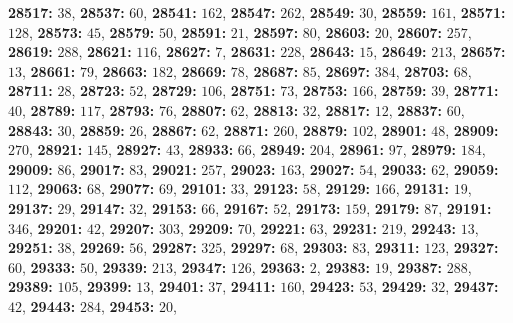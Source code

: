\textsf{\bfseries 28517:} $38$, \textsf{\bfseries 28537:} $60$, \textsf{\bfseries 28541:} $162$, \textsf{\bfseries 28547:} $262$, \textsf{\bfseries 28549:} $30$, \textsf{\bfseries 28559:} $161$, \textsf{\bfseries 28571:} $128$, \textsf{\bfseries 28573:} $45$, \textsf{\bfseries 28579:} $50$, \textsf{\bfseries 28591:} $21$, \textsf{\bfseries 28597:} $80$, \textsf{\bfseries 28603:} $20$, \textsf{\bfseries 28607:} $257$, \textsf{\bfseries 28619:} $288$, \textsf{\bfseries 28621:} $116$, \textsf{\bfseries 28627:} $7$, \textsf{\bfseries 28631:} $228$, \textsf{\bfseries 28643:} $15$, \textsf{\bfseries 28649:} $213$, \textsf{\bfseries 28657:} $13$, \textsf{\bfseries 28661:} $79$, \textsf{\bfseries 28663:} $182$, \textsf{\bfseries 28669:} $78$, \textsf{\bfseries 28687:} $85$, \textsf{\bfseries 28697:} $384$, \textsf{\bfseries 28703:} $68$, \textsf{\bfseries 28711:} $28$, \textsf{\bfseries 28723:} $52$, \textsf{\bfseries 28729:} $106$, \textsf{\bfseries 28751:} $73$, \textsf{\bfseries 28753:} $166$, \textsf{\bfseries 28759:} $39$, \textsf{\bfseries 28771:} $40$, \textsf{\bfseries 28789:} $117$, \textsf{\bfseries 28793:} $76$, \textsf{\bfseries 28807:} $62$, \textsf{\bfseries 28813:} $32$, \textsf{\bfseries 28817:} $12$, \textsf{\bfseries 28837:} $60$, \textsf{\bfseries 28843:} $30$, \textsf{\bfseries 28859:} $26$, \textsf{\bfseries 28867:} $62$, \textsf{\bfseries 28871:} $260$, \textsf{\bfseries 28879:} $102$, \textsf{\bfseries 28901:} $48$, \textsf{\bfseries 28909:} $270$, \textsf{\bfseries 28921:} $145$, \textsf{\bfseries 28927:} $43$, \textsf{\bfseries 28933:} $66$, \textsf{\bfseries 28949:} $204$, \textsf{\bfseries 28961:} $97$, \textsf{\bfseries 28979:} $184$, \textsf{\bfseries 29009:} $86$, \textsf{\bfseries 29017:} $83$, \textsf{\bfseries 29021:} $257$, \textsf{\bfseries 29023:} $163$, \textsf{\bfseries 29027:} $54$, \textsf{\bfseries 29033:} $62$, \textsf{\bfseries 29059:} $112$, \textsf{\bfseries 29063:} $68$, \textsf{\bfseries 29077:} $69$, \textsf{\bfseries 29101:} $33$, \textsf{\bfseries 29123:} $58$, \textsf{\bfseries 29129:} $166$, \textsf{\bfseries 29131:} $19$, \textsf{\bfseries 29137:} $29$, \textsf{\bfseries 29147:} $32$, \textsf{\bfseries 29153:} $66$, \textsf{\bfseries 29167:} $52$, \textsf{\bfseries 29173:} $159$, \textsf{\bfseries 29179:} $87$, \textsf{\bfseries 29191:} $346$, \textsf{\bfseries 29201:} $42$, \textsf{\bfseries 29207:} $303$, \textsf{\bfseries 29209:} $70$, \textsf{\bfseries 29221:} $63$, \textsf{\bfseries 29231:} $219$, \textsf{\bfseries 29243:} $13$, \textsf{\bfseries 29251:} $38$, \textsf{\bfseries 29269:} $56$, \textsf{\bfseries 29287:} $325$, \textsf{\bfseries 29297:} $68$, \textsf{\bfseries 29303:} $83$, \textsf{\bfseries 29311:} $123$, \textsf{\bfseries 29327:} $60$, \textsf{\bfseries 29333:} $50$, \textsf{\bfseries 29339:} $213$, \textsf{\bfseries 29347:} $126$, \textsf{\bfseries 29363:} $2$, \textsf{\bfseries 29383:} $19$, \textsf{\bfseries 29387:} $288$, \textsf{\bfseries 29389:} $105$, \textsf{\bfseries 29399:} $13$, \textsf{\bfseries 29401:} $37$, \textsf{\bfseries 29411:} $160$, \textsf{\bfseries 29423:} $53$, \textsf{\bfseries 29429:} $32$, \textsf{\bfseries 29437:} $42$, \textsf{\bfseries 29443:} $284$, \textsf{\bfseries 29453:} $20$, 
